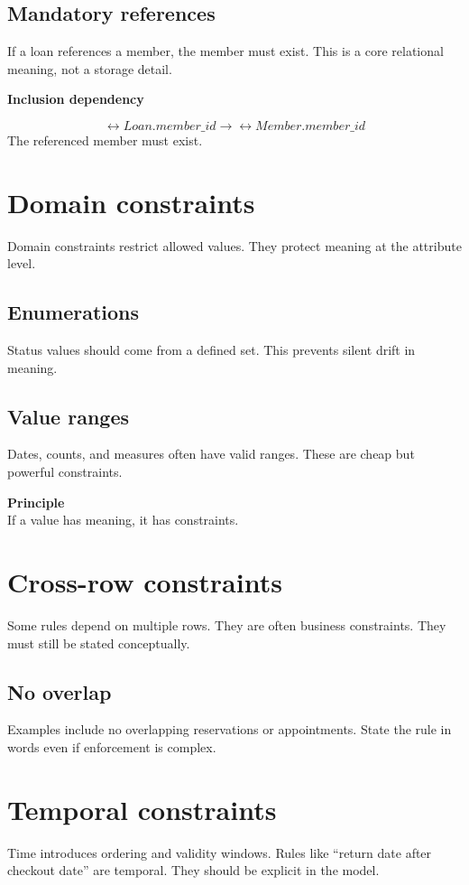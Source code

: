 \subsection{Mandatory references}
If a loan references a member, the member must exist.
This is a core relational meaning, not a storage detail.

\begin{examplebox}
\textbf{Inclusion dependency}\par\smallskip
\[
\rel{Loan}.member\_id \rightarrow \rel{Member}.member\_id
\]
The referenced member must exist.
\end{examplebox}

\section{Domain constraints}
Domain constraints restrict allowed values.
They protect meaning at the attribute level.

\subsection{Enumerations}
Status values should come from a defined set.
This prevents silent drift in meaning.

\subsection{Value ranges}
Dates, counts, and measures often have valid ranges.
These are cheap but powerful constraints.

\begin{principlebox}
\textbf{Principle}\\
If a value has meaning, it has constraints.
\end{principlebox}

\section{Cross-row constraints}
Some rules depend on multiple rows.
They are often business constraints.
They must still be stated conceptually.

\subsection{No overlap}
Examples include no overlapping reservations or appointments.
State the rule in words even if enforcement is complex.

\section{Temporal constraints}
Time introduces ordering and validity windows.
Rules like “return date after checkout date” are temporal.
They should be explicit in the model.


